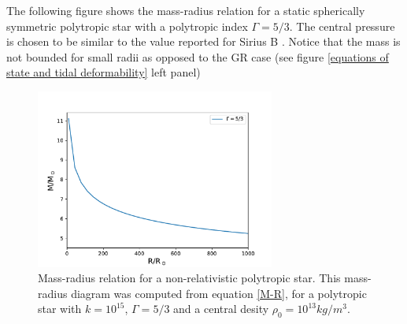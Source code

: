 The following figure shows the mass-radius relation for a static spherically symmetric polytropic star with a polytropic index $\Gamma=5/3$. The central pressure is chosen to be similar to the value reported for Sirius B \cite{Holberg_1998}. Notice that the mass is not bounded for small radii as opposed to the GR case (see figure \ref{equations of state and tidal deformability} left panel)



\begin{figure}[hbt!]
\begin{center}
\includegraphics[width=0.7\textwidth, angle=0]{images/polytrope_own.pdf}
\captionsetup{width=.8\textwidth}
\caption[Mass-radius relation for a non-relativistic polytropic star]{Mass-radius relation for a non-relativistic polytropic star. This mass-radius diagram was computed from equation \ref{M-R}, for a polytropic star with $k=10^{15}$, $\Gamma=5/3$ and a central desity $\rho_0=10^{13}kg/m^3$.}
\label{polytropes1}
\end{center}
\end{figure}

\FloatBarrier


